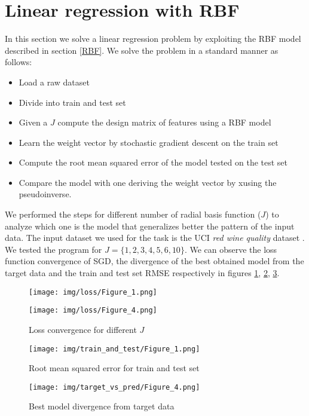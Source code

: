 \documentclass[runningheads]{llncs}
\begin{document}
\section{Linear regression with RBF}
In this section we solve a linear regression problem by exploiting the
RBF model described in section \ref{RBF}. We solve the problem in a
standard manner as follows:
\begin{itemize}
\item Load a raw dataset
\item Divide into train and test set
\item Given a $J$ compute the design matrix of features using a RBF model
\item Learn the weight vector by stochastic gradient descent on the train set
\item Compute the root mean squared error of the model tested
  on the test set
\item Compare the model with one deriving the weight vector by xusing the
  pseudoinverse.
\end{itemize}
We performed the steps for different number of radial basis function
($J$) to analyze which one is the model that generalizes better the
pattern of the input data. The input dataset we used for the task is
the UCI \textit{red wine quality} dataset \cite{wine_data}. We tested
the program for $J = \{1, 2, 3, 4, 5, 6, 10\}$. We can observe the
loss function convergence of SGD, the divergence of the best obtained
model from the target data and the train and test set RMSE
respectively in figures \ref{fig1}, \ref{fig2}, \ref{fig3}.
\begin{figure}[!tbp]
  \centering
  \begin{minipage}[b]{0.45\textwidth}
    \texttt{[image: img/loss/Figure\_1.png]}
  \end{minipage}
  \hfill
  \begin{minipage}[b]{0.45\textwidth}
    \texttt{[image: img/loss/Figure\_4.png]}
  \end{minipage}
 \caption{Loss convergence for different $J$}\label{fig1}
\end{figure}
\begin{figure}
    \centering
\texttt{[image: img/train\_and\_test/Figure\_1.png]}
\caption{Root mean squared error for train and test set}\label{fig2}
\end{figure}
\begin{figure}
    \centering
\texttt{[image: img/target\_vs\_pred/Figure\_4.png]}
\caption{Best model divergence from target data}\label{fig3}
\end{figure}
\end{document}
